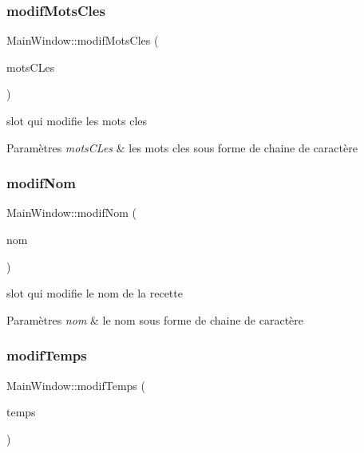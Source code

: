 \subsubsection{\texorpdfstring{modif\+Mots\+Cles}{modifMotsCles}}
{\footnotesize\ttfamily Main\+Window\+::modif\+Mots\+Cles (\begin{DoxyParamCaption}\item[{Q\+String}]{mots\+C\+Les }\end{DoxyParamCaption})\hspace{0.3cm}{\ttfamily [slot]}}



slot qui modifie les mots cles 


\begin{DoxyParams}{Paramètres}
{\em mots\+C\+Les} & les mots cles sous forme de chaine de caractère \\
\hline
\end{DoxyParams}
\mbox{\label{classMainWindow_a38a15d5bcba3d46fef95cb060c8cfb81}} 
\subsubsection{\texorpdfstring{modif\+Nom}{modifNom}}
{\footnotesize\ttfamily Main\+Window\+::modif\+Nom (\begin{DoxyParamCaption}\item[{Q\+String}]{nom }\end{DoxyParamCaption})\hspace{0.3cm}{\ttfamily [slot]}}



slot qui modifie le nom de la recette 


\begin{DoxyParams}{Paramètres}
{\em nom} & le nom sous forme de chaine de caractère \\
\hline
\end{DoxyParams}
\mbox{\label{classMainWindow_a8bd5bdfbeb09cb4899069f18e07a5f66}} 
\subsubsection{\texorpdfstring{modif\+Temps}{modifTemps}}
{\footnotesize\ttfamily Main\+Window\+::modif\+Temps (\begin{DoxyParamCaption}\item[{Q\+String}]{temps }\end{DoxyParamCaption})\hspace{0.3cm}{\ttfamily [slot]}}



